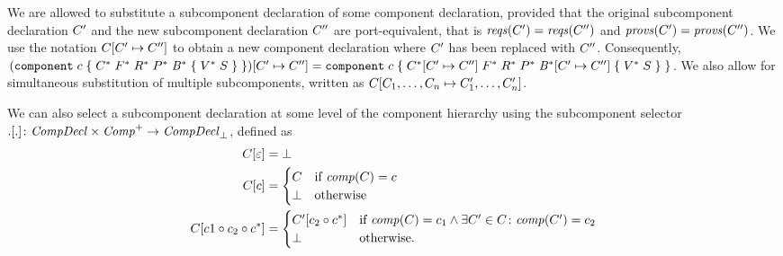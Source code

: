 \documentclass[a4paper,10pt,english]{article}
\begin{document}
We are allowed to substitute a subcomponent declaration of some component declaration, provided that
the original subcomponent declaration $C'$ and the new subcomponent declaration $C''$ are port-equivalent, that is
$\mathit{reqs}(C') = \mathit{reqs}(C'')$ and $\mathit{provs}(C') = \mathit{provs}(C'')$.
We use the notation $C[C' \mapsto C'']$ to obtain a new component declaration
where $C'$ has been replaced with $C''$. Consequently,
$(\texttt{component} \; c \; \mathtt{\{} \; C^* \; F^* \; R^* \; P^* \; \mathit{B}^* \; \mathtt{\{} \; V^* \; S \; \mathtt{\}} \; \mathtt{\}})[C'
\mapsto C''] =
\texttt{component} \; c \; \mathtt{\{} \; C^*[C'
\mapsto C''] \; F^* \; R^* \; P^* \; \mathit{B}^*[C'
\mapsto C''] \; \mathtt{\{} \; V^* \; S \; \mathtt{\}} \; \mathtt{\}}$. We also allow for simultaneous substitution of multiple subcomponents, written as
$C[C_1, \ldots, C_n \mapsto C_1', \ldots, C_n']$.

We can also select a subcomponent declaration at some level of the component hierarchy using the subcomponent selector $.[.]
\colon \mathit{CompDecl} \times \mathit{Comp}^+ \rightarrow \mathit{CompDecl}_\bot$, defined as
\begin{align*}
	C[\varepsilon] &= \bot \\
	C[c] &= \begin{cases}
		C & \text{if } \mathit{comp}(C) = c \\
		\bot & \text{otherwise}
	\end{cases} \\
	C[c1 \circ c_2 \circ c^*] &= 
		\begin{cases}
			C'[c_2 \circ c^*] & \text{if } 
				\mathit{comp}(C) = c_1 \wedge \exists C' \in C \colon \mathit{comp}(C') = c_2 \\
			\bot & \text{otherwise.}
		\end{cases}
\end{align*}
\end{document}
